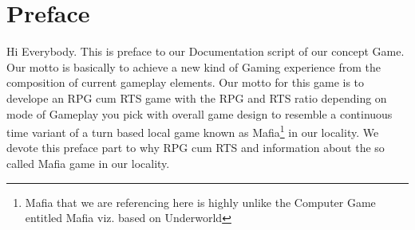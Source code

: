 \chapter{Preface}
Hi Everybody. This is preface to our Documentation script of our concept Game. Our motto is basically to achieve a new kind of Gaming experience from the composition of current gameplay elements. Our motto for this game is to develope an RPG cum RTS game with the RPG and RTS ratio depending on mode of Gameplay you pick with overall game design to resemble a continuous time variant of a turn based local game known as Mafia\footnote{Mafia that we are referencing here is highly unlike the Computer Game entitled Mafia viz. based on Underworld } in our locality. We devote this preface part to why RPG cum RTS and information about the so called Mafia game in our locality.